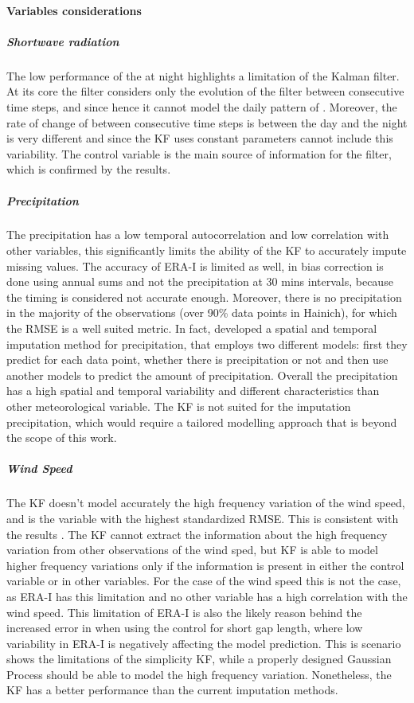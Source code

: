 \documentclass{article}
\begin{document}
\paragraph{Variables considerations}

\subparagraph{Shortwave radiation} The low performance of the  at night highlights a limitation of the Kalman filter.  At its core the filter considers only the evolution of the filter between consecutive time steps, and since  hence it cannot model the daily pattern of . Moreover, the rate of change of  between consecutive time steps is between the day and the night is very different and since the KF uses constant parameters cannot include this variability. The control variable is the main source of information for the filter, which is confirmed by the results.

\subparagraph{Precipitation} The precipitation has a low temporal autocorrelation and low correlation with other variables, this significantly limits the ability of the KF to accurately impute missing values. The accuracy of ERA-I is limited as well, in  bias correction is done using annual sums and not the precipitation at 30 mins intervals, because the timing is considered not accurate enough. Moreover, there is no precipitation in the majority of the observations (over 90\% data points in Hainich), for which the RMSE is a well suited metric. In fact, \cite{chivers_imputation_2020} developed a spatial and temporal imputation method for precipitation, that employs two different models: first they predict for each data point, whether there is precipitation or not and then use another models to predict the amount of precipitation.  Overall the precipitation has a high spatial and temporal variability \cite{mital_sequential_2020} and different characteristics  than other meteorological variable. The KF is not suited for the imputation precipitation, which would require a tailored modelling approach that is beyond the scope of this work.

\subparagraph{Wind Speed} The KF doesn't model accurately the high frequency variation of the wind speed, and is the variable with the highest standardized RMSE. This is consistent with the results \cite{vuichard_filling_2015}. The KF cannot extract the information about the high frequency variation from other observations of the wind sped, but KF is able to model higher frequency variations only if the information is present in either the control variable or in other variables. For the case of the wind speed this is not the case, as ERA-I has this limitation and no other variable has a high correlation with the wind speed. This limitation of ERA-I is also the likely reason behind the increased error in  when using the control for short gap length, where low variability in ERA-I is negatively affecting the model prediction.
This is scenario shows the limitations of the simplicity KF, while a properly designed Gaussian Process should be able to model the high frequency variation. Nonetheless, the KF has a better performance than the current imputation methods. 
\end{document}
